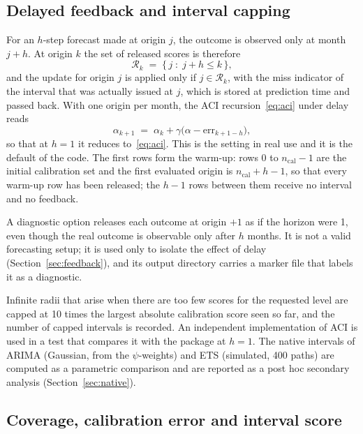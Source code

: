 \subsection{Delayed feedback and interval capping}\label{sec:delay}

For an $h$-step forecast made at origin $j$, the outcome is observed only at month $j+h$. At origin $k$ the set of released scores is therefore
\begin{equation}\label{eq:released}
\mathcal R_k \;=\; \{\,j \;:\; j+h\le k\,\},
\end{equation}
and the update for origin $j$ is applied only if $j\in\mathcal R_k$, with the miss indicator of the interval that was actually issued at $j$, which is stored at prediction time and passed back. With one origin per month, the ACI recursion~\eqref{eq:aci} under delay reads
\begin{equation}\label{eq:acidelay}
\alpha_{k+1} \;=\; \alpha_k + \gamma\bigl(\alpha - \mathrm{err}_{k+1-h}\bigr),
\end{equation}
so that at $h=1$ it reduces to~\eqref{eq:aci}. This is the setting in real use and it is the default of the code. The first rows form the warm-up: rows $0$ to $n_{\mathrm{cal}}-1$ are the initial calibration set and the first evaluated origin is $n_{\mathrm{cal}}+h-1$, so that every warm-up row has been released; the $h-1$ rows between them receive no interval and no feedback.

A diagnostic option releases each outcome at origin $+1$ as if the horizon were 1, even though the real outcome is observable only after $h$ months. It is not a valid forecasting setup; it is used only to isolate the effect of delay (Section~\ref{sec:feedback}), and its output directory carries a marker file that labels it as a diagnostic.

Infinite radii that arise when there are too few scores for the requested level are capped at 10 times the largest absolute calibration score seen so far, and the number of capped intervals is recorded. An independent implementation of ACI is used in a test that compares it with the package at $h=1$. The native intervals of ARIMA (Gaussian, from the $\psi$-weights) and ETS (simulated, 400 paths) are computed as a parametric comparison and are reported as a post hoc secondary analysis (Section~\ref{sec:native}).

\subsection{Coverage, calibration error and interval score}\label{sec:evalmetrics}

